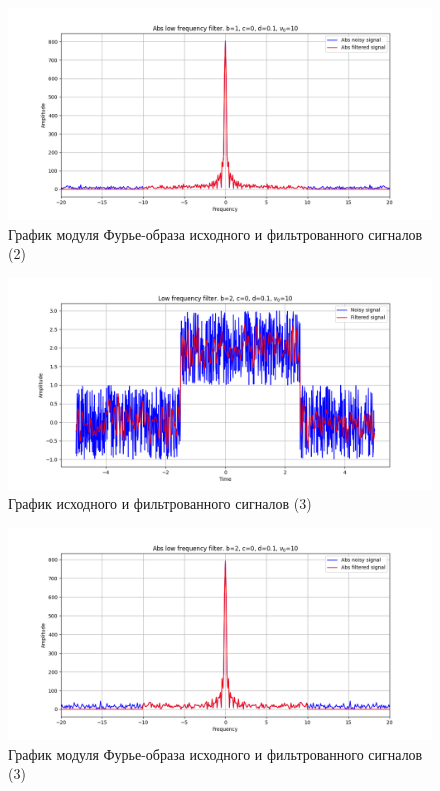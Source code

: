 \documentclass[a4paper, 12pt]{article}
\begin{document}
    \begin{figure}[!htb]
        \centering
        \includegraphics[scale=0.48]{2_abs_u_U_nohigh.png}
        \captionsetup{skip=0pt}
        \caption{График модуля Фурье-образа исходного и фильтрованного сигналов (2)}
        \label{fig:fig4}
    \end{figure}
    \begin{figure}[!htb]
        \centering
        \includegraphics[scale=0.48]{3_u_flt_u_nohigh.png}
        \captionsetup{skip=0pt}
        \caption{График исходного и фильтрованного сигналов (3)}
        \label{fig:fig5}
    \end{figure}
    \begin{figure}[!htb]
        \centering
        \includegraphics[scale=0.48]{3_abs_u_U_nohigh.png}
        \captionsetup{skip=0pt}
        \caption{График модуля Фурье-образа исходного и фильтрованного сигналов (3)}
        \label{fig:fig6}
    \end{figure}
\end{document}
